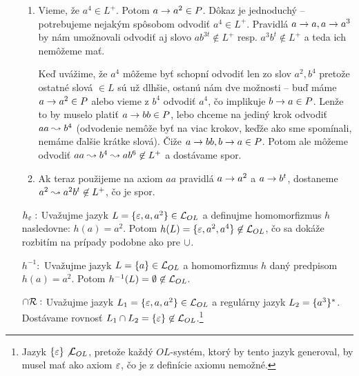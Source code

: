 \begin{dokaz}
\begin{itemize}
\begin{enumerate}
        \item Vieme, že $a^4 \in L^{+}$. Potom ${a \rightarrow a^2} \in P$.
            Dôkaz je jednoduchý
            -- potrebujeme nejakým spôsobom odvodiť $a^4 \in L^{+}$.
            Pravidlá $a \rightarrow a, a \rightarrow a^3$ by nám
            umožnovali odvodiť aj slovo $a b^{3t} \not\in L^{+}$
            resp. $a^3 b^t \not \in L^{+}$ a teda ich nemôžeme mať.
           
            Keď uvážime, že $a^4$ môžeme byť schopní odvodiť len zo
            slov $a^2, b^4$ pretože ostatné slová $\in L$ sú už
            dlhšie, ostanú nám dve možnosti -- buď máme
            ${a \rightarrow a^2} \in P$ alebo vieme z $b^4$ odvodiť $a^4$,
            čo implikuje $b \rightarrow a \in P$. Lenže to by muselo
            platiť ${a \rightarrow bb} \in P$, lebo chceme na jediný krok
            odvodiť $aa \leadsto b^4$ (odvodenie nemôže byť na viac
            krokov, keďže ako sme spomínali, nemáme ďalšie krátke
            slová).
            Čiže ${a \rightarrow bb, b \rightarrow a} \in P$.
            Potom ale môžeme odvodiť $aa \leadsto b^4 \leadsto
              a b^6 \not \in L^{+}$ a dostávame spor.

        \item Ak teraz použijeme na axiom $aa$ pravidlá 
            $a \rightarrow a^2$ a $a \rightarrow b^{t}$, dostaneme 
            $a^2 \leadsto a^2 b^t \not\in L^{+}$, čo je spor.
        \end{enumerate}

    \item[$h_{\varepsilon}:$] Uvažujme jazyk
        $L=\{\varepsilon, a, a^2\} \in \mathcal{L}_{OL}$ a definujme
        homomorfizmus $h$ nasledovne: $h(a)=a^2$. Potom
        $h(L)=\{\varepsilon, a^2, a^4\} \not \in \mathcal{L}_{OL}$, čo sa
        dokáže rozbitím na prípady podobne ako pre $\cup$.

    \item[$h^{-1}:$] Uvažujme jazyk $L=\{a\} \in \mathcal{L}_{OL}$ a
        homomorfizmus $h$ daný predpisom $h(a)=a^2$. Potom
        $h^{-1}(L)=\emptyset \not\in \mathcal{L}_{OL}$.

    \item[$\cap \mathcal{R} :$] Uvažujme jazyk
        $L_1=\{\varepsilon, a, a^2\} \in \mathcal{L}_{OL}$ a regulárny
        jazyk $L_2=\{a^3\}^{*}$.
        Dostávame rovnosť
        $L_1 \cap L_2 = \{\varepsilon\} \not\in \mathcal{L}_{OL}$.\footnote{
            Jazyk $\{\varepsilon\} \not \mathcal{L}_{OL}$, pretože každý
            $OL$-systém, ktorý by tento jazyk generoval, by musel mať ako
            axiom $\varepsilon$, čo je z definície axiomu nemožné.
        }
    \end{itemize}
\end{dokaz}

